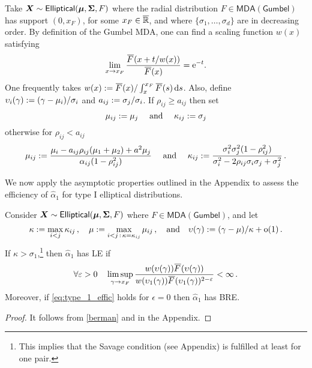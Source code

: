 Take $\bm{X} \sim \mathsf{Elliptical}(\bm{\mu}, \bm{\Sigma}, F)$ where the radial distribution $F \in \mathsf{MDA(Gumbel)}$ has support $(0,x_F)$, for some $x_F \in \overline{\mathbb{R}}$, and where $\{\sigma_1, \dots, \sigma_d\}$ are in decreasing order. By definition of the Gumbel MDA, one can find a scaling function $w(x)$ satisfying
\begin{equation*}
  \lim_{x\to x_F} \frac{\Ftail(x+t/w(x))}{\Ftail(x)}=\e^{-t}.
\end{equation*}
One frequently takes $w(x)\defeq \Ftail(x) / \int_{x}^{x_F}\Ftail(s) \dd s$.
Also, define $\upsilon_i(\gamma) := (\gamma - \mu_i)/\sigma_i$ and $a_{ij} := \sigma_j/\sigma_i$. If $\rho_{ij} \ge a_{ij}$ then set
 \[ \mu_{ij} := \mu_j \quad \text{ and } \quad \kappa_{ij} := \sigma_j \]
 otherwise for $\rho_{ij} < a_{ij}$
 \[ \mu_{ij} := \frac{\mu_i-a_{ij}\rho_{ij}(\mu_1+\mu_2)+a^2\mu_j}{\alpha_{ij}(1-\rho^2_{ij})} \quad \text{ and } \quad \kappa_{ij} := \frac{\sigma_i^2\sigma_j^2(1-\rho^2_{ij})}{ {\sigma_i^2-2\rho_{ij}\sigma_i\sigma_j + \sigma_{j}^2}} \,. \]

We now apply the asymptotic properties outlined in the
Appendix to assess the efficiency of $\hat{\alpha}_1$ for type I elliptical distributions.

\begin{theorem} \label{thm:ellip_efficiency}
Consider $\bm{X} \sim \mathsf{Elliptical}(\bm{\mu}, \bm{\Sigma}, F)$ where $F \in \mathsf{MDA(Gumbel)}$, and let
 \[ \kappa := \max_{i<j} \kappa_{ij} \,, \quad \mu := \max_{i<j \,:\, \kappa = \kappa_{ij}} \mu_{ij} \,, \quad \text{and} \quad  \upsilon(\gamma) := (\gamma-\mu)/\kappa + {\mathrm{o}}(1) \,. \]
 If $\kappa>\sigma_1$,\footnote{This implies that the Savage condition (see Appendix) is fulfilled at least for one pair.} then $\hat{\alpha}_1$ has LE if
 \begin{equation} \label{eq:type_1_effic}
 	\forall \epsilon>0 \quad
   \limsup_{\gamma\to x_F}\frac{w(\upsilon(\gamma))\Ftail(\upsilon(\gamma))}
   {w(\upsilon_1(\gamma))\Ftail(\upsilon_1(\gamma))^{2-\epsilon}}<\infty \,.
 \end{equation}
 Moreover, if \eqref{eq:type_1_effic} holds for $\epsilon=0$ then $\hat{\alpha}_1$ has BRE.
\end{theorem}

\begin{proof}
 It follows from \eqref{berman} and  in the Appendix.
\end{proof}


